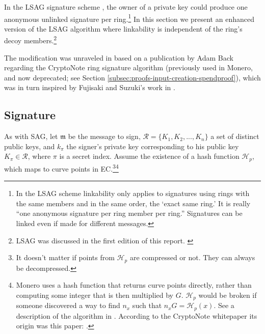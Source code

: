 In the LSAG signature scheme \cite{Liu2004}, the owner of a private key could produce one anonymous unlinked signature per ring.\footnote{\label{lsag_linkability_note}In the LSAG scheme linkability only applies to signatures using rings with the same members and in the same order, the `exact same ring.’ It is really ``one anonymous signature per ring member per ring.” Signatures can be linked even if made for different messages.} In this section we present an enhanced version of the LSAG algorithm where linkability is independent of the ring’s decoy members.\footnote{LSAG was discussed in the first edition of this report. \cite{ztm-1}}

The modification was unraveled in \cite{MRL-0005-ringct} based on a publication by Adam Back \cite{AdamBack-ring-efficiency} regarding the CryptoNote \cite{cryptoNoteWhitePaper} ring signature algorithm (previously used in Monero, and now deprecated; see Section \ref{subsec:proofs-input-creation-spendproof}), which was in turn inspired by Fujisaki and Suzuki's work in \cite{Fujisaki2007}.


\subsection*{Signature}

As with SAG, let \(\mathfrak{m}\) be the message to sign, \(\mathcal{R} = \{K_1, K_2, ..., K_n\}\) a set of distinct public keys, and \(k_\pi\) the signer's private key corresponding to his public key \(K_\pi \in \mathcal{R}\), where $\pi$ is a secret index. Assume the existence of a hash function \(\mathcal{H}_p\), which maps to curve points in EC.\footnote{It doesn’t matter if points from $\mathcal{H}_p$ are compressed or not. They can always be decompressed.}\footnote{Monero uses a hash function that returns curve points directly, rather than computing some integer that is then multiplied by $G$. $\mathcal{H}_p$ would be broken if someone discovered a way to find $n_x$ such that $n_x G = \mathcal{H}_p(x)$. See a description of the algorithm in \cite{hashtopoint-writeup}. According to the CryptoNote whitepaper \cite{cryptoNoteWhitePaper} its origin was this paper: \cite{hashtopoint-original-paper}.}


